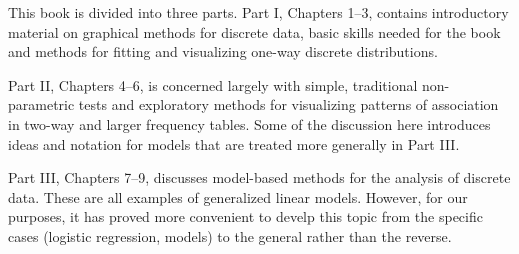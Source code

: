 
This book is divided into three parts. Part I, Chapters 1--3, contains 
introductory material on graphical methods for discrete data, 
basic \R skills needed for the book and methods for fitting
and visualizing one-way discrete distributions.

Part II, Chapters 4--6, is concerned largely with 
simple, traditional non-parametric tests and exploratory methods for
visualizing patterns of association in two-way and larger frequency tables.
Some of the discussion here introduces ideas and notation for \loglin
models that are treated more generally in Part III.

Part III, Chapters 7--9, discusses model-based methods for the
analysis of discrete data.  These are all examples of generalized
linear models.  However, for our purposes, it has proved more convenient
to develp this topic from the specific cases (logistic regression, \loglin models)
to the general rather than the reverse.

